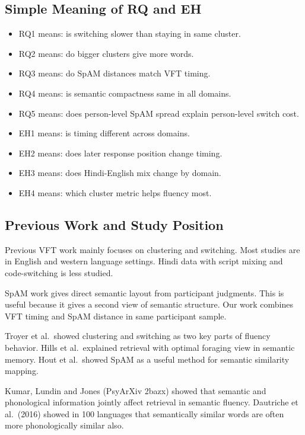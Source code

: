 \subsection{Simple Meaning of RQ and
EH}\label{simple-meaning-of-rq-and-eh}

\begin{itemize}
\tightlist
\item
  RQ1 means: is switching slower than staying in same cluster.
\item
  RQ2 means: do bigger clusters give more words.
\item
  RQ3 means: do SpAM distances match VFT timing.
\item
  RQ4 means: is semantic compactness same in all domains.
\item
  RQ5 means: does person-level SpAM spread explain person-level switch
  cost.
\item
  EH1 means: is timing different across domains.
\item
  EH2 means: does later response position change timing.
\item
  EH3 means: does Hindi-English mix change by domain.
\item
  EH4 means: which cluster metric helps fluency most.
\end{itemize}

\subsection{Previous Work and Study
Position}\label{previous-work-and-study-position}

Previous VFT work mainly focuses on clustering and switching. Most
studies are in English and western language settings. Hindi data with
script mixing and code-switching is less studied.

SpAM work gives direct semantic layout from participant judgments. This
is useful because it gives a second view of semantic structure. Our work
combines VFT timing and SpAM distance in same participant sample.

Troyer et al.~showed clustering and switching as two key parts of
fluency behavior. Hills et al.~explained retrieval with optimal foraging
view in semantic memory. Hout et al.~showed SpAM as a useful method for
semantic similarity mapping.

Kumar, Lundin and Jones (PsyArXiv 2bazx) showed that semantic and
phonological information jointly affect retrieval in semantic fluency.
Dautriche et al.~(2016) showed in 100 languages that semantically
similar words are often more phonologically similar also.

